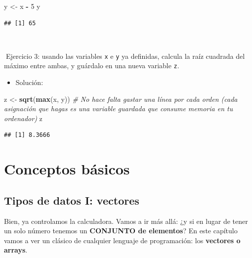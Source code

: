 \documentclass[11pt,]{book}
\newenvironment{Shaded}{\begin{snugshade}}{\end{snugshade}}
\newcommand{\CommentTok}[1]{\textcolor[rgb]{0.37,0.37,0.37}{\textit{#1}}}
\newcommand{\DecValTok}[1]{\textcolor[rgb]{0.06,0.06,0.06}{#1}}
\newcommand{\KeywordTok}[1]{\textcolor[rgb]{0.27,0.27,0.27}{\textbf{#1}}}
\newcommand{\NormalTok}[1]{#1}
\newcommand{\OperatorTok}[1]{\textcolor[rgb]{0.43,0.43,0.43}{\textbf{#1}}}
\newcommand{\StringTok}[1]{\textcolor[rgb]{0.5,0.5,0.5}{#1}}
\providecommand{\tightlist}{%
  \setlength{\itemsep}{0pt}\setlength{\parskip}{0pt}}
\begin{document}
\begin{Shaded}
\begin{Highlighting}[]
\NormalTok{y <-}\StringTok{ }\NormalTok{x }\OperatorTok{-}\StringTok{ }\DecValTok{5}
\NormalTok{y}
\end{Highlighting}
\end{Shaded}

\begin{verbatim}
## [1] 65
\end{verbatim}

~

📝Ejercicio 3: usando las variables \texttt{x} e \texttt{y} ya definidas, calcula la raíz cuadrada del máximo entre ambas, y guárdalo en una nueva variable \texttt{z}.

\begin{itemize}
\tightlist
\item
  Solución:
\end{itemize}

\begin{Shaded}
\begin{Highlighting}[]
\NormalTok{z <-}\StringTok{ }\KeywordTok{sqrt}\NormalTok{(}\KeywordTok{max}\NormalTok{(x, y)) }\CommentTok{# No hace falta gastar una línea por cada orden (cada asignación que hagas es una variable guardada que consume memoria en tu ordenador)}
\NormalTok{z}
\end{Highlighting}
\end{Shaded}

\begin{verbatim}
## [1] 8.3666
\end{verbatim}

\hypertarget{part-conceptos-buxe1sicos}{%
\part{Conceptos básicos}\label{part-conceptos-buxe1sicos}}

\hypertarget{tipos-de-datos-i-vectores}{%
\chapter{Tipos de datos I: vectores}\label{tipos-de-datos-i-vectores}}

Bien, ya controlamos la calculadora. Vamos a ir más allá: ¿y si en lugar de tener un solo número tenemos un \textbf{CONJUNTO de elementos}? En este capítulo vamos a ver un clásico de cualquier lenguaje de programación: los \textbf{vectores o arrays}.
\end{document}
